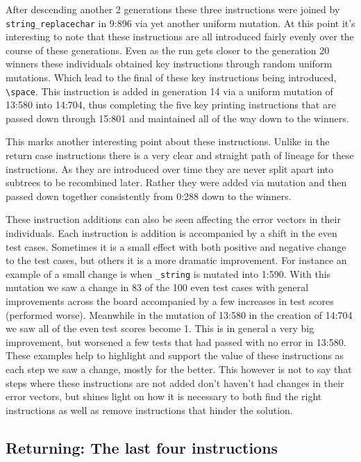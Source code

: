 After descending another 2 generations these three instructions were joined by \texttt{string\_replacechar}
in 9:896 via yet another uniform mutation. At this point it's interesting to note that these instructions are
all introduced fairly evenly over the course of these generations. Even as the run gets closer to the generation
20 winners these individuals obtained key instructions through random uniform mutations. Which lead to
the final of these key instructions being introduced, \texttt{\textbackslash space}.
This instruction is added in generation 14 via a uniform mutation of 13:580 into 14:704, thus completing the five key printing
instructions that are passed down through 15:801 and maintained all of the way down to the winners.

This marks another interesting point about these instructions. Unlike in the return case instructions there is a 
very clear and straight path of lineage for these instructions. As they are introduced over time they 
are never split apart into subtrees to be recombined later. Rather they were added via mutation and 
then passed down together consistently from 0:288 down to the winners.

These instruction additions can also be seen affecting the error vectors in their individuals. Each instruction is addition
is accompanied by a shift in the even test cases. Sometimes it is a small effect with both positive and negative change
to the test cases, but others it is a more dramatic improvement. For instance an example of a small change is when
\texttt{\printindex\_string} is mutated into 1:590. With this mutation we saw a change in 83 of the 100 even test cases
with general improvements across the board accompanied by a few increases in test scores (performed worse). Meanwhile in
the mutation of 13:580  in the creation of 14:704 we saw all of the even test scores become 1. This is in general a very
big improvement, but worsened a few tests that had passed with no error in 13:580. These examples help to highlight
and support the value of these instructions as each step we saw a change, mostly for the better. This however is not to
say that steps where these instructions are not added don't haven't had changes in their error vectors, but shines light
on how it is necessary to both find the right instructions as well as remove instructions that hinder the solution.

\subsection{Returning: The last four instructions}
\label{sec:Returning}

